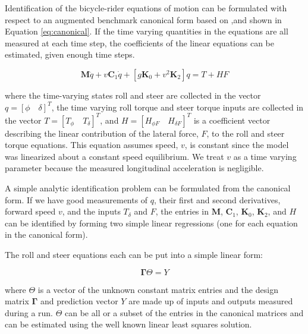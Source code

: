 \documentclass[a4paper]{article}
\begin{document}
Identification of the bicycle-rider equations of motion can be formulated with
respect to an augmented benchmark canonical form based on \cite{Meijaard2007},and 
shown in Equation \ref{eq:canonical}. If the time varying quantities in the
equations are all measured at each time step, the coefficients of the linear
equations can be estimated, given enough time steps.

\begin{equation}
  \mathbf{M} \ddot{q} + v \mathbf{C}_1 \dot{q} + [g \mathbf{K}_0 + v^2
  \mathbf{K}_2] q = T + H F
  \label{eq:canonical}
\end{equation}

where the time-varying states roll and steer are collected in the vector $q =
[\phi \quad \delta]^T$, the time varying  roll torque and steer torque inputs
are collected in the vector $T = [T_\phi \quad T_\delta]^T$, and $H = [H_{\phi
F} \quad H_{\delta F}]^T$ is a coefficient vector describing the linear contribution of the
lateral force, $F$, to the roll and steer torque equations. This equation
assumes  speed, $v$, is constant since the model was
linearized about a constant speed equilibrium. We treat $v$ as a time
varying parameter because the measured longitudinal acceleration is negligible.


A simple analytic identification problem can be formulated from the canonical
form. If we have good measurements of $q$, their first and second derivatives,
forward speed $v$, and the inputs $T_\delta$ and $F$, the entries in
$\mathbf{M}$, $\mathbf{C}_1$, $\mathbf{K}_0$, $\mathbf{K}_2$, and $H$ can be
identified by forming two simple linear regressions (one for each equation
in the canonical form).

The roll and steer equations each can be put into a simple linear form:

\begin{equation}
  \mathbf{\Gamma} \Theta = Y
\end{equation}

where $\Theta$ is a vector of the unknown constant matrix entries and the
design matrix $\mathbf{\Gamma}$ and  prediction vector $Y$ are made up
of inputs and outputs measured during a run. $\Theta$ can be all or a
subset of the entries in the canonical matrices and can be estimated using the
well known linear least squares solution.
\end{document}
